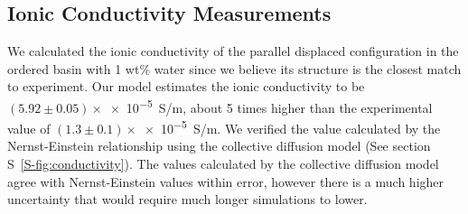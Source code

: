 \documentclass[journal=jpcbfk,manuscript=article]{achemso}
\begin{document}
  \subsection{Ionic Conductivity Measurements}
 

  
  
  
  We calculated the ionic conductivity of the parallel displaced configuration in
  the ordered basin with 1 wt\% water since we believe its structure is the 
  closest match to experiment. Our model estimates the ionic conductivity to be
  $(5.92 \pm 0.05)\times$\num{e-5}~S/m, about 5 times higher than the experimental value of 
  $(1.3 \pm 0.1)\times$\num{e-5}~S/m. We verified the value calculated by the Nernst-Einstein
  relationship using the collective diffusion model\cite{liu_collective_2013} 
  (See section S~\ref{S-fig:conductivity}). The values calculated by the 
  collective diffusion model agree with Nernst-Einstein values within error, 
  however there is a much higher uncertainty that would require much longer 
  simulations to lower.
  

\end{document}
